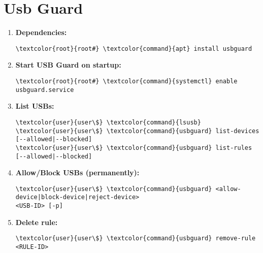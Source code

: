 \documentclass[10pt, a4paper, onecolumn, openany]{book} %
\begin{document}
\section{Usb Guard}
\begin{enumerate}
    \item \textbf{Dependencies:}
\begin{Verbatim}[commandchars=\\\{\}]
\textcolor{root}{root#} \textcolor{command}{apt} install usbguard
\end{Verbatim}
    \item \textbf{Start USB Guard on startup:}
\begin{Verbatim}[commandchars=\\\{\}]
\textcolor{root}{root#} \textcolor{command}{systemctl} enable usbguard.service
\end{Verbatim}
    \item \textbf{List USBs:}
\begin{Verbatim}[commandchars=\\\{\}]
\textcolor{user}{user\$} \textcolor{command}{lsusb}
\textcolor{user}{user\$} \textcolor{command}{usbguard} list-devices [--allowed|--blocked]
\textcolor{user}{user\$} \textcolor{command}{usbguard} list-rules [--allowed|--blocked]
\end{Verbatim}
    \item \textbf{Allow/Block USBs (permanently):}
\begin{Verbatim}[commandchars=\\\{\}]
\textcolor{user}{user\$} \textcolor{command}{usbguard} <allow-device|block-device|reject-device>
<USB-ID> [-p]
\end{Verbatim}
    \item \textbf{Delete rule:}
\begin{Verbatim}[commandchars=\\\{\}]
\textcolor{user}{user\$} \textcolor{command}{usbguard} remove-rule <RULE-ID>
\end{Verbatim}
\end{enumerate}
\end{document}
